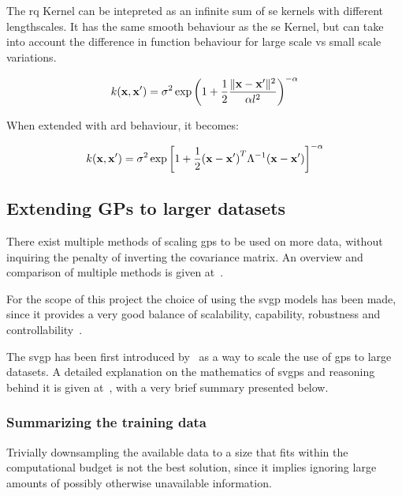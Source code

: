 The \acrfull{rq} Kernel can be intepreted as an infinite sum of \acrshort{se}
kernels with different lengthscales. It has the same smooth behaviour as the
\acrlong{se} Kernel, but can take into account the difference in function
behaviour for large scale vs small scale variations.

\begin{equation}
    k(\mathbf{x}, \mathbf{x'}) = \sigma^2 \exp{\left(1+\frac{1}{2}\frac{\lVert\mathbf{x} -
    \mathbf{x'}\rVert^2}{\alpha l^2}\right)}^{-\alpha}
\end{equation}

When extended with \acrshort{ard} behaviour, it becomes:

\begin{equation}
k(\mathbf{x}, \mathbf{x'})
= \sigma^2\exp{\left[1 + \frac{1}{2} {(\mathbf{x} - \mathbf{x'})}^T \Lambda^{-1}
(\mathbf{x} - \mathbf{x'})\right]}^{-\alpha} \\
\end{equation}



\subsection{Extending GPs to larger datasets}

There exist multiple methods of scaling \acrshort{gp}s to be used on more data,
without inquiring the penalty of inverting the covariance matrix. An overview
and comparison of multiple methods is given
at~\cite{liuUnderstandingComparingScalable2019}.

For the scope of this project the choice of using the \acrfull{svgp} models has
been made, since it provides a very good balance of scalability, capability,
robustness and controllability~\cite{liuUnderstandingComparingScalable2019}.

The \acrlong{svgp} has been first introduced
by~\textcite{hensmanGaussianProcessesBig2013} as a way to scale the use of
\acrshort{gp}s to large datasets. A detailed explanation on the mathematics of
\acrshort{svgp}s and reasoning behind it is given
at~\cite{yiSparseVariationalGaussian2021}, with a very brief summary presented
below.

\subsubsection{Summarizing the training data}

Trivially downsampling the available data to a size that fits within the
computational budget is not the best solution, since it implies ignoring large
amounts of possibly otherwise unavailable information.

